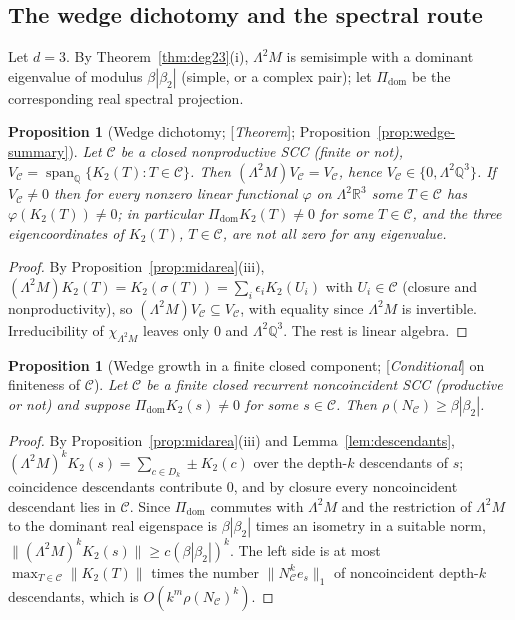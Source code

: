 \documentclass[11pt]{amsart}
\theoremstyle{plain}
\newtheorem{proposition}[theorem]{Proposition}
\theoremstyle{definition}
\theoremstyle{remark}
\newcommand{\Q}{\mathbb{Q}}
\newcommand{\R}{\mathbb{R}}
\newcommand{\cC}{\mathcal{C}}
\newcommand{\Status}[1]{\textup{[\textit{#1}]}}
\begin{document}
\subsection{The wedge dichotomy and the spectral route}\label{sec:wedge}

Let $d=3$. By Theorem~\ref{thm:deg23}(i), $\Lambda^2M$ is semisimple with a dominant eigenvalue of modulus $\beta|\beta_2|$ (simple, or a complex pair); let $\Pi_{\mathrm{dom}}$ be the corresponding real spectral projection.

\begin{proposition}[Wedge dichotomy; \Status{Theorem}; Proposition~\ref{prop:wedge-summary}]\label{prop:wedge-dichotomy}
Let $\cC$ be a closed nonproductive SCC (finite or not), $V_\cC=\operatorname{span}_\Q\{K_2(T):T\in\cC\}$. Then $(\Lambda^2M)V_\cC=V_\cC$, hence $V_\cC\in\{0,\Lambda^2\Q^3\}$. If $V_\cC\ne0$ then for every nonzero linear functional $\varphi$ on $\Lambda^2\R^3$ some $T\in\cC$ has $\varphi(K_2(T))\ne0$; in particular $\Pi_{\mathrm{dom}}K_2(T)\ne0$ for some $T\in\cC$, and the three eigencoordinates of $K_2(T)$, $T\in\cC$, are not all zero for any eigenvalue.
\end{proposition}
\begin{proof}
By Proposition~\ref{prop:midarea}(iii), $(\Lambda^2M)K_2(T)=K_2(\sigma(T))=\sum_i\epsilon_iK_2(U_i)$ with $U_i\in\cC$ (closure and nonproductivity), so $(\Lambda^2M)V_\cC\subseteq V_\cC$, with equality since $\Lambda^2M$ is invertible. Irreducibility of $\chi_{\Lambda^2M}$ leaves only $0$ and $\Lambda^2\Q^3$. The rest is linear algebra.
\end{proof}

\begin{proposition}[Wedge growth in a finite closed component; \Status{Conditional} on finiteness of $\cC$]\label{prop:v34}
Let $\cC$ be a finite closed recurrent noncoincident SCC (productive or not) and suppose $\Pi_{\mathrm{dom}}K_2(s)\ne0$ for some $s\in\cC$. Then $\rho(N_\cC)\ge\beta|\beta_2|$.
\end{proposition}
\begin{proof}
By Proposition~\ref{prop:midarea}(iii) and Lemma~\ref{lem:descendants}, $(\Lambda^2M)^kK_2(s)=\sum_{c\in D_k}\pm K_2(c)$ over the depth-$k$ descendants of $s$; coincidence descendants contribute $0$, and by closure every noncoincident descendant lies in $\cC$. Since $\Pi_{\mathrm{dom}}$ commutes with $\Lambda^2M$ and the restriction of $\Lambda^2M$ to the dominant real eigenspace is $\beta|\beta_2|$ times an isometry in a suitable norm, $\|(\Lambda^2M)^kK_2(s)\|\ge c(\beta|\beta_2|)^k$. The left side is at most $\max_{T\in\cC}\|K_2(T)\|$ times the number $\|N_\cC^ke_s\|_1$ of noncoincident depth-$k$ descendants, which is $O(k^m\rho(N_\cC)^k)$.
\end{proof}
\end{document}
